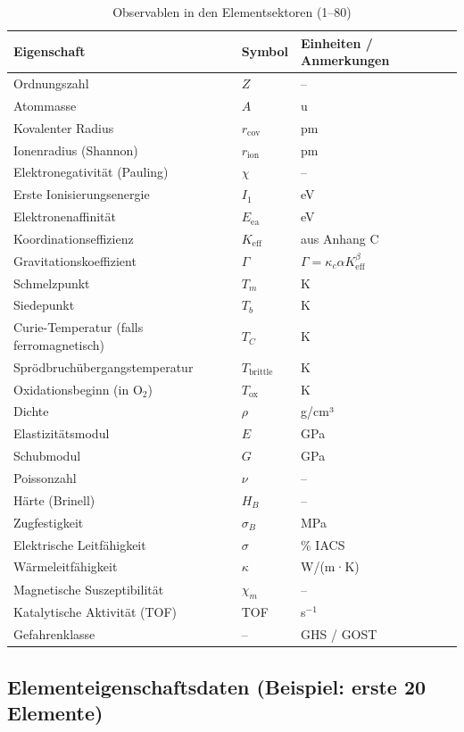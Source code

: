 \documentclass[12pt,a4paper]{article}
\newcommand{\Keff}{K_{\mathrm{eff}}}
\newcommand{\Gcoeff}{\Gamma}
\begin{document}
	\begin{longtable}{p{4cm} p{3cm} p{8cm}}
		\caption{Observablen in den Elementsektoren (1–80)} \\
		\toprule
		\textbf{Eigenschaft} & \textbf{Symbol} & \textbf{Einheiten / Anmerkungen} \\
		\midrule
		Ordnungszahl & \(Z\) & – \\
		Atommasse & \(A\) & u \\
		Kovalenter Radius & \(r_{\text{cov}}\) & pm \\
		Ionenradius (Shannon) & \(r_{\text{ion}}\) & pm \\
		Elektronegativität (Pauling) & \(\chi\) & – \\
		Erste Ionisierungsenergie & \(I_1\) & eV \\
		Elektronenaffinität & \(E_{\text{ea}}\) & eV \\
		Koordinationseffizienz & \(\Keff\) & aus Anhang C \\
		Gravitationskoeffizient & \(\Gcoeff\) & \(\Gcoeff = \kappa_c \alpha \Keff^{\beta}\) \\
		Schmelzpunkt & \(T_m\) & K \\
		Siedepunkt & \(T_b\) & K \\
		Curie-Temperatur (falls ferromagnetisch) & \(T_C\) & K \\
		Sprödbruchübergangstemperatur & \(T_{\text{brittle}}\) & K \\
		Oxidationsbeginn (in O\(_{2}\)) & \(T_{\text{ox}}\) & K \\
		Dichte & \(\rho\) & g/cm³ \\
		Elastizitätsmodul & \(E\) & GPa \\
		Schubmodul & \(G\) & GPa \\
		Poissonzahl & \(\nu\) & – \\
		Härte (Brinell) & \(H_B\) & – \\
		Zugfestigkeit & \(\sigma_B\) & MPa \\
		Elektrische Leitfähigkeit & \(\sigma\) & \% IACS \\
		Wärmeleitfähigkeit & \(\kappa\) & W/(m·K) \\
		Magnetische Suszeptibilität & \(\chi_m\) & – \\
		Katalytische Aktivität (TOF) & TOF & s\(^{-1}\) \\
		Gefahrenklasse & – & GHS / GOST \\
		\bottomrule
	\end{longtable}
	
	\subsection{Elementeigenschaftsdaten (Beispiel: erste 20 Elemente)}
	
\end{document}
